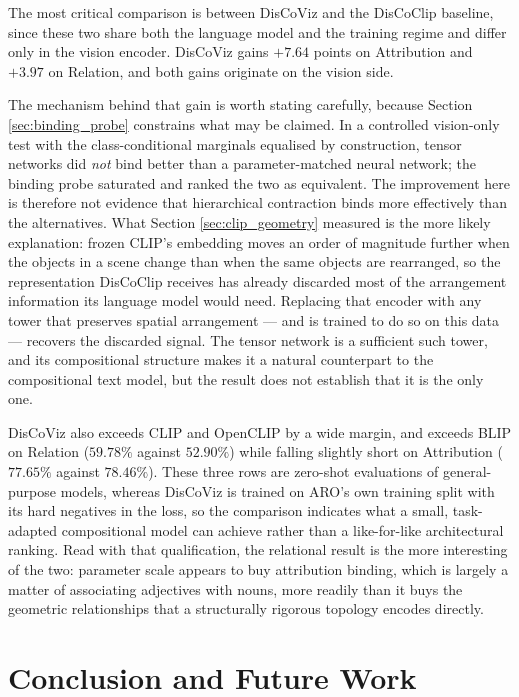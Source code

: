 \documentclass[12pt, a4paper, oneside]{report}
\begin{document}
The most critical comparison is between DisCoViz and the DisCoClip baseline, since these two share both the language model and the training regime and differ only in the vision encoder. DisCoViz gains $+7.64$ points on Attribution and $+3.97$ on Relation, and both gains originate on the vision side.

The mechanism behind that gain is worth stating carefully, because Section \ref{sec:binding_probe} constrains what may be claimed. In a controlled vision-only test with the class-conditional marginals equalised by construction, tensor networks did \emph{not} bind better than a parameter-matched neural network; the binding probe saturated and ranked the two as equivalent. The improvement here is therefore not evidence that hierarchical contraction binds more effectively than the alternatives. What Section \ref{sec:clip_geometry} measured is the more likely explanation: frozen CLIP's embedding moves an order of magnitude further when the objects in a scene change than when the same objects are rearranged, so the representation DisCoClip receives has already discarded most of the arrangement information its language model would need. Replacing that encoder with any tower that preserves spatial arrangement --- and is trained to do so on this data --- recovers the discarded signal. The tensor network is a sufficient such tower, and its compositional structure makes it a natural counterpart to the compositional text model, but the result does not establish that it is the only one.

DisCoViz also exceeds CLIP and OpenCLIP by a wide margin, and exceeds BLIP on Relation ($59.78\%$ against $52.90\%$) while falling slightly short on Attribution ($77.65\%$ against $78.46\%$). These three rows are zero-shot evaluations of general-purpose models, whereas DisCoViz is trained on ARO's own training split with its hard negatives in the loss, so the comparison indicates what a small, task-adapted compositional model can achieve rather than a like-for-like architectural ranking. Read with that qualification, the relational result is the more interesting of the two: parameter scale appears to buy attribution binding, which is largely a matter of associating adjectives with nouns, more readily than it buys the geometric relationships that a structurally rigorous topology encodes directly.


\chapter{Conclusion and Future Work}
\end{document}
